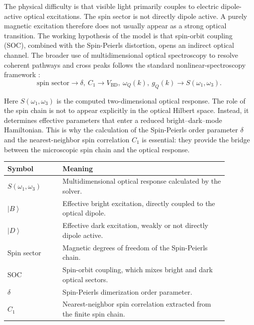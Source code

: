 \documentclass[11pt]{article}
\newcommand{\ket}[1]{\left|#1\right\rangle}
\begin{document}
The physical difficulty is that visible light primarily couples to electric dipole-active optical excitations. The spin sector is not directly dipole active. A purely magnetic excitation therefore does not usually appear as a strong optical transition. The working hypothesis of the model is that spin-orbit coupling (SOC), combined with the Spin-Peierls distortion, opens an indirect optical channel. The broader use of multidimensional optical spectroscopy to resolve coherent pathways and cross peaks follows the standard nonlinear-spectroscopy framework \cite{Mukamel1995,CundiffMukamel2013}:
\begin{equation}
\text{spin sector}
\longrightarrow
\delta,\ C_1
\longrightarrow
V_{\mathrm{BD}},\ \omega_Q(k),\ g_Q(k)
\longrightarrow
S(\omega_1,\omega_3).
\end{equation}

Here \(S(\omega_1,\omega_3)\) is the computed two-dimensional optical response. The role of the spin chain is not to appear explicitly in the optical Hilbert space. Instead, it determines effective parameters that enter a reduced bright--dark--mode Hamiltonian. This is why the calculation of the Spin-Peierls order parameter \(\delta\) and the nearest-neighbor spin correlation \(C_1\) is essential: they provide the bridge between the microscopic spin chain and the optical response.

\begin{center}
\begin{tabular}{>{\centering\arraybackslash}p{0.22\linewidth} p{0.66\linewidth}}
\toprule
Symbol & Meaning \\
\midrule
\(S(\omega_1,\omega_3)\) & Multidimensional optical response calculated by the solver. \\
\(\ket{B}\) & Effective bright excitation, directly coupled to the optical dipole. \\
\(\ket{D}\) & Effective dark excitation, weakly or not directly dipole active. \\
Spin sector & Magnetic degrees of freedom of the Spin-Peierls chain. \\
SOC & Spin-orbit coupling, which mixes bright and dark optical sectors. \\
\(\delta\) & Spin-Peierls dimerization order parameter. \\
\(C_1\) & Nearest-neighbor spin correlation extracted from the finite spin chain. \\
\bottomrule
\end{tabular}
\end{center}
\end{document}
